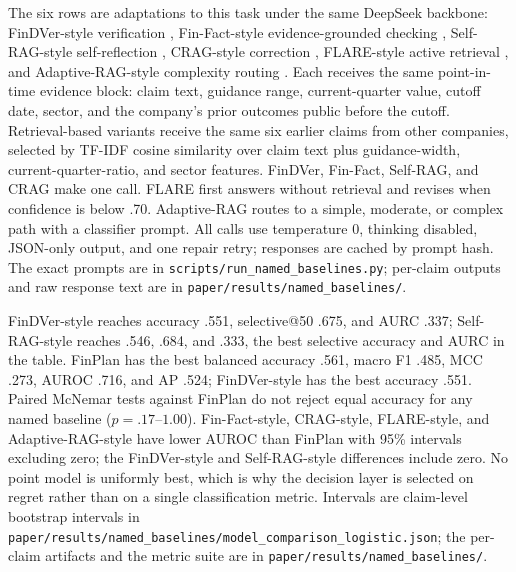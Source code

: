 \documentclass[11pt]{article}
\begin{document}
\begin{table}[t]
\label{tab:metrics}
\end{table}

The six rows are adaptations to this task under the same DeepSeek
backbone: FinDVer-style verification \citep{zhao2024findver}, Fin-Fact-style
evidence-grounded checking \citep{rangapur2025finfact}, Self-RAG-style
self-reflection \citep{asai2024selfrag}, CRAG-style correction
\citep{yan2024crag}, FLARE-style active retrieval \citep{jiang2023flare}, and
Adaptive-RAG-style complexity routing \citep{jeong2024adaptiverag}. Each
receives the same point-in-time evidence block: claim text, guidance range,
current-quarter value, cutoff date, sector, and the company's prior outcomes
public before the cutoff. Retrieval-based variants receive the same six
earlier claims from other companies, selected by TF-IDF cosine similarity over
claim text plus guidance-width, current-quarter-ratio, and sector features.
FinDVer, Fin-Fact, Self-RAG, and CRAG make one call. FLARE first answers
without retrieval and revises when confidence is below .70. Adaptive-RAG
routes to a simple, moderate, or complex path with a classifier prompt. All
calls use temperature 0, thinking disabled, JSON-only output, and one repair
retry; responses are cached by prompt hash. The exact prompts are in
\texttt{scripts/\allowbreak run\_named\_baselines.py}; per-claim outputs and
raw response text are in
\texttt{paper/\allowbreak results/\allowbreak named\_baselines/}.

FinDVer-style reaches accuracy .551, selective@50 .675, and AURC .337;
Self-RAG-style reaches .546, .684, and .333, the best selective accuracy and
AURC in the table. FinPlan has the best balanced accuracy .561, macro F1 .485,
MCC .273, AUROC .716, and AP .524; FinDVer-style has the best accuracy .551.
Paired McNemar tests against FinPlan do not reject equal accuracy for any named
baseline ($p=.17$--$1.00$). Fin-Fact-style, CRAG-style, FLARE-style, and
Adaptive-RAG-style have lower AUROC than FinPlan with 95\% intervals excluding
zero; the FinDVer-style and Self-RAG-style differences include zero. No point
model is uniformly best, which is why the decision layer is selected on regret
rather than on a single classification metric. Intervals are claim-level
bootstrap intervals in
\texttt{paper/\allowbreak results/\allowbreak named\_baselines/\allowbreak model\_comparison\_logistic.json};
the per-claim artifacts and the metric suite are in
\texttt{paper/\allowbreak results/\allowbreak named\_baselines/}.
\end{document}
